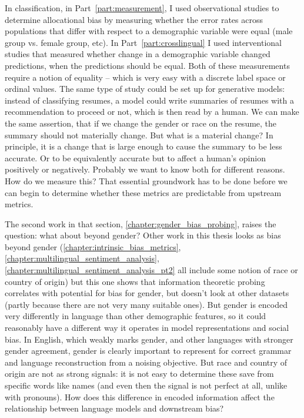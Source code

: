 In classification, in Part~\ref{part:measurement}, I used observational studies to determine allocational bias by measuring whether the error rates across populations that differ with respect to a demographic variable were equal (male group vs. female group, etc). In Part~\ref{part:crosslingual} I used interventional studies that measured whether change in a demographic variable changed predictions, when the predictions should be equal. Both of these measurements require a notion of equality -- which is very easy with a discrete label space or ordinal values. The same type of study could be set up for generative models: instead of classifying resumes, a model could write summaries of resumes with a recommendation to proceed or not, which is then read by a human. We can make the same assertion, that if we change the gender or race on the resume, the summary should not materially change. But what is a material change? In principle, it is a change that is large enough to cause the summary to be less accurate. Or to be equivalently accurate but to affect a human's opinion positively or negatively. Probably we want to know both for different reasons. How do we measure this? That essential groundwork has to be done before we can begin to determine whether these metrics are predictable from upstream metrics.

The second work in that section, \ref{chapter:gender_bias_probing}, raises the question: what about beyond gender? Other work in this thesis looks as bias beyond gender (\ref{chapter:intrinsic_bias_metrics}, \ref{chapter:multilingual_sentiment_analysis}, \ref{chapter:multilingual_sentiment_analysis_pt2} all include some notion of race or country of origin) but this one shows that information theoretic probing correlates with potential for bias for gender, but doesn't look at other datasets (partly because there are not very many suitable ones). But gender is encoded very differently in language than other demographic features, so it could reasonably have a different way it operates in model representations and social bias. In English, which weakly marks gender, and other languages with stronger gender agreement, gender is clearly important to represent for correct grammar and language reconstruction from a noising objective. But race and country of origin are not as strong signals: it is not easy to determine these save from specific words like names (and even then the signal is not perfect at all, unlike with pronouns). How does this difference in encoded information affect the relationship between language models and downstream bias?

